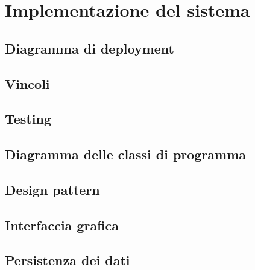 \chapter{Implementazione del sistema}




\section{Diagramma di deployment}




\section{Vincoli}




\section{Testing}




\section{Diagramma delle classi di programma}




\section{Design pattern}




\section{Interfaccia grafica}




\section{Persistenza dei dati}
